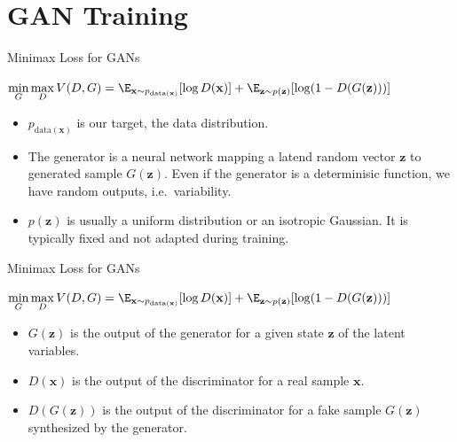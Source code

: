 \section{GAN Training}

\begin{frame} {Minimax Loss for GANs}
  \begin{tcolorbox}
  $\min \limits_G \max \limits_D V(D,G) = \E_{\mathbf{x}\sim p_{\text{data}(\mathbf{x})}}[\log D(\mathbf{x})] + \E_{\mathbf{z}\sim p(\mathbf{z})}[\log (1 - D(G(\mathbf{z})))]$
  \end{tcolorbox}
   \begin{itemize}
  \vspace{6mm}
      \item $p_{\text{data}(\mathbf{x})}$ is our target, the data distribution.
  \vspace{6mm}
  \item The generator is a neural network mapping a latend random vector $\mathbf{z}$ to generated sample $G(\mathbf{z})$. Even if the generator is a determinisic function, we have random outputs, i.e.~variability. 
  \vspace{6mm}
      \item $p(\mathbf{z})$ is usually a uniform distribution or an isotropic Gaussian. It is typically fixed and not adapted during training.

   \end{itemize}
\end{frame}

\begin{frame} {Minimax Loss for GANs}
  \begin{tcolorbox}
    $\min \limits_G \max \limits_D V(D,G) = \E_{\mathbf{x}\sim p_{\text{data}(\mathbf{x})}}[\log D(\mathbf{x})] + \E_{\mathbf{z}\sim p(\mathbf{z})}[\log (1 - D(G(\mathbf{z})))]$
  \end{tcolorbox}
  \begin{itemize}
  \vspace{6mm}
    \item $G(\mathbf{z})$ is the output of the generator for a given state $\mathbf{z}$ of the latent variables.
  \vspace{6mm}
      \item $D(\mathbf{x})$ is the output of the discriminator for a real sample $\mathbf{x}$.
  \vspace{6mm}
      \item $D(G(\mathbf{z}))$ is the output of the discriminator for a fake sample $G(\mathbf{z})$ synthesized by the generator.
  \end{itemize}
\end{frame}


